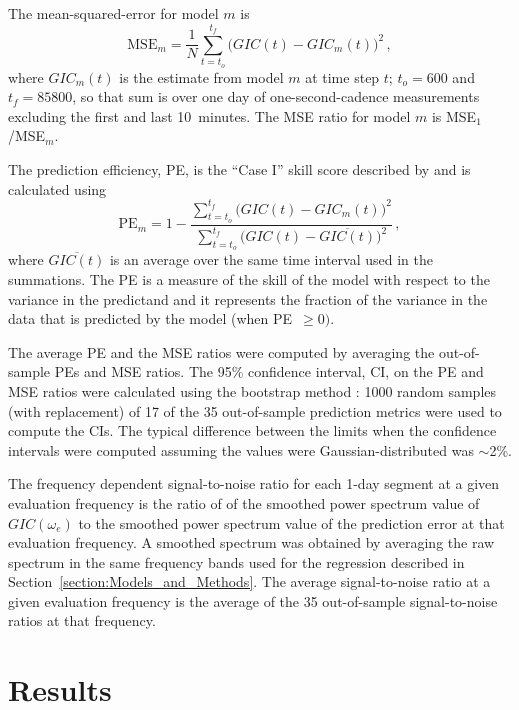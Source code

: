 \documentclass[draft,linenumbers]{agujournal2018}
\begin{document}
The mean-squared-error for model $m$ is
\begin{equation*}
  \mbox{MSE}_m = \frac{1}{N}\sum_{t=t_o}^{t_f} \big(GIC(t)-GIC_m(t)\big)^2 \,,
\end{equation*}
\noindent
where $GIC_m(t)$ is the estimate from model $m$ at time step $t$;  $t_o=600$ and $t_f=85800$, so that sum is over one day of one-second-cadence measurements excluding the first and last 10~minutes. The MSE ratio for model $m$ is MSE$_1$/MSE$_m$.

The prediction efficiency, PE, is the ``Case I'' skill score described by \cite{Murphy1988} and is calculated using
\begin{equation*}
  \mbox{PE}_m = 1 - \frac{\sum_{t=t_o}^{t_f} \big(GIC(t)-GIC_m(t)\big)^2}{\sum_{t=t_o}^{t_f} \big(GIC(t)-\overline{GIC(t)}\big)^2}\,,
\end{equation*}
\noindent
where $\overline{GIC(t)}$ is an average over the same time interval used in the summations. The PE is a measure of the skill of the model with respect to the variance in the predictand and it represents the fraction of the variance in the data that is predicted by the model (when PE~$\ge 0)$.

The average PE and the MSE ratios were computed by averaging the out-of-sample PEs and MSE ratios. The 95\% confidence interval, CI, on the PE and MSE ratios were calculated using the bootstrap method \citep{Zoubir1998}: 1000 random samples (with replacement) of 17 of the 35 out-of-sample prediction metrics were used to compute the CIs. The typical difference between the limits when the confidence intervals were computed assuming the values were Gaussian-distributed was $\sim$2\%.

The frequency dependent signal-to-noise ratio for each 1-day segment at a given evaluation frequency is the ratio of of the smoothed power spectrum value of $GIC(\omega_e)$ to the smoothed power spectrum value of the prediction error at that evaluation frequency. A smoothed spectrum was obtained by averaging the raw spectrum in the same frequency bands used for the regression described in Section~\ref{section:Models_and_Methods}. The average signal-to-noise ratio at a given evaluation frequency is the average of the 35 out-of-sample signal-to-noise ratios at that frequency.

\section{Results}
\label{results}
\end{document}
